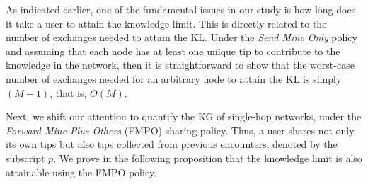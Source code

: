 \documentclass[12pt,epsf]{article}
\newtheorem{theorem}{Theorem}
\theoremstyle{definition}
\newtheorem*{cor}{Corollary}
\begin{document}
%
%
As indicated earlier, one of the fundamental issues in our study is how long does it take a user to attain the knowledge limit. This is directly related to the number 
of exchanges needed to attain the KL. Under the {\it Send Mine Only} policy and assuming that each node has at least one unique tip to contribute to the knowledge in the network, then it is straightforward to show that the worst-case number of exchanges needed for an arbitrary node to attain the KL is simply $(M-1)$, that is, $O(M)$.

Next, we shift our attention to quantify the KG of single-hop networks, under the {\it Forward Mine Plus Others} (FMPO) sharing policy. Thus, a user shares not only its own tips but also tips collected from previous encounters, denoted by the subscript $p$. We prove in the following proposition that the knowledge limit is also attainable using the FMPO policy.
\end{document}
